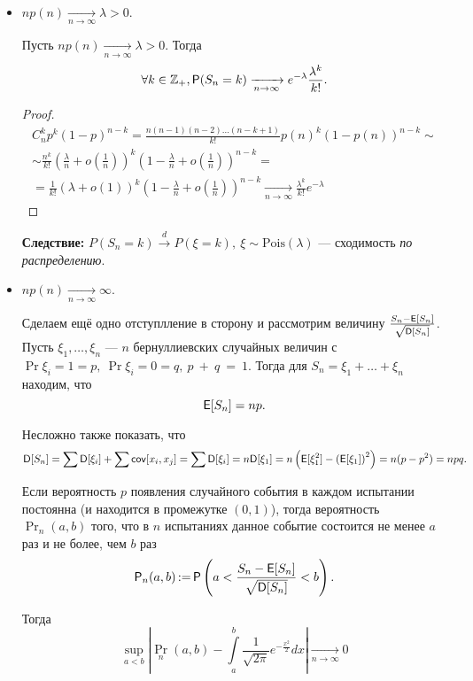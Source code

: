 \begin{itemize}
    \item
        $np(n) \xrightarrow[n\to\infty]{} \lambda > 0$. 

        \begin{theorem}[Пуассон]

            Пусть $np(n) \xrightarrow[n\to\infty]{} \lambda > 0$. 
            Тогда 
                \[
                    \forall k \in \Z_+, \Pr(S_n = k) \xrightarrow[n\to\infty]{} e^{-\lambda}\frac{\lambda^k}{k!}.
                \]
        \end{theorem}
        \begin{proof}
            \begin{multline*}
                C_n^kp^k(1-p)^{n-k} =
                \frac{n(n-1)(n-2)\ldots(n-k+1)}{k!}p(n)^k(1-p(n))^{n-k} \sim\\\sim
                \frac{n^k}{k!}\left(\frac{\lambda}{n}+o\left(\frac{1}{n}\right)\right)^k\left( 1-\frac{\lambda}{n}+o\left( \frac{1}{n} \right) \right)^{n-k} =\\=
                \frac{1}{k!}\left(\lambda+o\left(1\right)\right)^k\left( 1-\frac{\lambda}{n}+o\left( \frac{1}{n} \right) \right)^{n-k} \xrightarrow[n\to\infty]{}
                \frac{\lambda^k}{k!}e^{-\lambda}
            \end{multline*}
        \end{proof}
        \textbf{Следствие:} $P(S_n = k) \overset{d}{\to} P(\xi = k),\ \xi \sim \mathrm{Pois}(\lambda)$ --- сходимость \emph{по распределению}.

    \item
        $np(n) \xrightarrow[n\to\infty]{} \infty$. 

        Сделаем ещё одно отступлление в сторону и рассмотрим величину $\frac{S_n - \E[S_n]}{\sqrt{\D[S_n]}}$.
        Пусть \(\xi_1, \ldots, \xi_n \) --- $ n $ бернуллиевских случайных величин с \(\Pr{\xi_i = 1} = p,\ \Pr{\xi_i = 0} = q,\ p~+~q~=~1. \) Тогда для \(S_n = \xi_1 + \ldots + \xi_n \) 
        находим, что 
        \[
            \E[S_n] = np.
        \]
        
        Несложно также показать, что 
        \[
            \D[S_n] = \sum\D[\xi_i] + \sum\cov[x_i, x_j] = \sum\D[\xi_i] = n\D[\xi_1] = n\left( \E[\xi_1^2]-\left( \E[\xi_1] \right)^2 \right) = n(p - p^2) = npq.
        \]

        \begin{theorem}
           Если вероятность $p$ появления случайного события в каждом испытании постоянна (и находится в промежутке $ (0, 1) $), тогда вероятность $ \Pr_n(a, b) $ того, что в $ n $ испытаниях данное событие состоится не менее $ a $ раз и не более, чем $ b $ раз
            \[
                \Pr_n(a,b)\mathop{:=} \Pr\left( a < \frac{S_n - \E[S_n]}{\sqrt{\D[S_n]}} < b \right).
            \]

            Тогда 
            \[
                \sup_{a<b} \left|\Pr_n(a, b) - \int\limits_a^b\frac{1}{\sqrt{2\pi}}e^{-\frac{x^{2}}{2}}dx\right| \xrightarrow[n\to\infty]{} 0
            \]
        \end{theorem}
    
\end{itemize}
